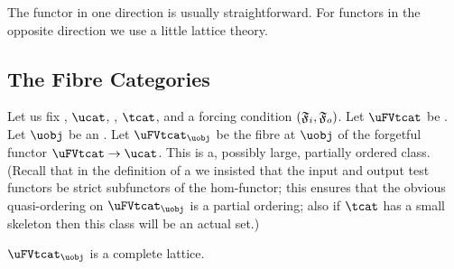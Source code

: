 \documentclass[%
12pt,%
arxiv,%
defaults
]{myclass}
\begin{document}
The functor in one direction is usually straightforward.
For functors in the opposite direction we use a little lattice theory.

\subsection{The Fibre Categories}

Let us fix \ucat, \(\ucat\), \tcat, \(\tcat\), and a forcing condition \((\iforce, \oforce)\).
Let \(\uFVtcat\) be \uFVtcat.
Let \(\uobj\) be an \uobj.
Let \(\uFVtcat_{\uobj}\) be the fibre at \(\uobj\) of the forgetful functor \(\uFVtcat \to \ucat\).
This is a, possibly large, partially ordered class.
(Recall that in the definition of a \uVtobj we insisted that the input and output test functors be strict subfunctors of the hom\hyp{}functor; this ensures that the obvious quasi\hyp{}ordering on \(\uFVtcat_{\uobj}\) is a partial ordering; also if \(\tcat\) has a small skeleton then this class will be an actual set.)

\begin{proposition}
\label{prop:lattice}
\(\uFVtcat_{\uobj}\) is a complete lattice.
\end{proposition}
\end{document}
